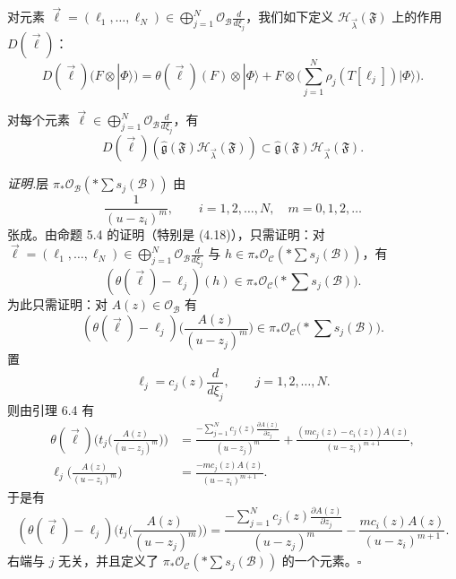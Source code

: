 \begin{definition}[6.5]
对元素 $\vec\ell=(\ell_1,\dots,\ell_N)\in\bigoplus_{j=1}^{N}\mathcal{O}_{\mathcal{B}}\frac{d}{d\xi_j}$，我们如下定义 $\mathcal{H}_{\vec\lambda}(\mathfrak{F})$ 上的作用 $D(\vec\ell)$：
\begin{equation}
D(\vec\ell)(F\otimes|\Phi\rangle)=\theta(\vec\ell)(F)\otimes|\Phi\rangle+F\otimes\Big(\sum_{j=1}^{N}\rho_j(T[\ell_j])|\Phi\rangle\Big).\tag{6.18}
\end{equation}
\end{definition}
\begin{proposition}[6.6]
对每个元素 $\vec\ell\in\bigoplus_{j=1}^{N}\mathcal{O}_{\mathcal{B}}\frac{d}{d\xi_j}$，有
\[
D(\vec\ell)(\hat{\mathfrak{g}}(\mathfrak{F})\mathcal{H}_{\vec\lambda}(\mathfrak{F}))\subset\hat{\mathfrak{g}}(\mathfrak{F})\mathcal{H}_{\vec\lambda}(\mathfrak{F}).
\]
\end{proposition}
\noindent\textit{证明.}\quad 层 $\pi_*\mathcal{O}_{\mathcal{B}}(*\sum s_j(\mathcal{B}))$ 由
\[
\frac{1}{(u-z_i)^m},\qquad i=1,2,\dots,N,\quad m=0,1,2,\dots
\]
张成。由命题 5.4 的证明（特别是 (4.18)），只需证明：对 $\vec\ell=(\ell_1,\dots,\ell_N)\in\bigoplus_{j=1}^{N}\mathcal{O}_{\mathcal{B}}\frac{d}{d\xi_j}$ 与 $h\in\pi_*\mathcal{O}_{\mathcal{C}}(*\sum s_j(\mathcal{B}))$，有
\[
(\theta(\vec\ell)-\ell_j)(h)\in\pi_*\mathcal{O}_{\mathcal{C}}\Big(*\sum s_j(\mathcal{B})\Big).
\]
为此只需证明：对 $A(z)\in\mathcal{O}_{\mathcal{B}}$ 有
\[
(\theta(\vec\ell)-\ell_j)\Big(\frac{A(z)}{(u-z_j)^m}\Big)\in\pi_*\mathcal{O}_{\mathcal{C}}\Big(*\sum s_j(\mathcal{B})\Big).
\]
置
\[
\ell_j=c_j(z)\frac{d}{d\xi_j},\qquad j=1,2,\dots,N.
\]
则由引理 6.4 有
\begin{align*}
\theta(\vec\ell)\Big(t_j\Big(\frac{A(z)}{(u-z_j)^m}\Big)\Big)&=\frac{-\sum_{j=1}^{N}c_j(z)\frac{\partial A(z)}{\partial z_j}}{(u-z_j)^m}+\frac{(mc_j(z)-c_i(z))A(z)}{(u-z_i)^{m+1}},\\
\ell_j\Big(\frac{A(z)}{(u-z_i)^m}\Big)&=\frac{-mc_j(z)A(z)}{(u-z_i)^{m+1}}.
\end{align*}
于是有
\[
(\theta(\vec\ell)-\ell_j)\Big(t_j\Big(\frac{A(z)}{(u-z_j)^m}\Big)\Big)=\frac{-\sum_{j=1}^{N}c_j(z)\frac{\partial A(z)}{\partial z_j}}{(u-z_j)^m}-\frac{mc_i(z)A(z)}{(u-z_i)^{m+1}}.
\]
右端与 $j$ 无关，并且定义了 $\pi_*\mathcal{O}_{\mathcal{C}}(*\sum s_j(\mathcal{B}))$ 的一个元素。\hfill$\square$
